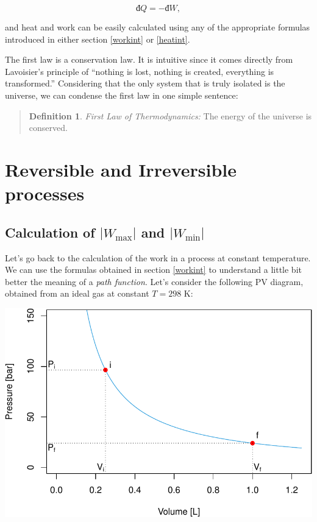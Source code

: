 \documentclass[
  9pt,
]{extbook}
\theoremstyle{definition}
\newtheorem{definition}{Definition}[chapter]
\theoremstyle{definition}
\theoremstyle{definition}
\theoremstyle{remark}
\begin{document}
\begin{equation}
  đ Q = -đ W,
  \label{eq:heateqwork}
\end{equation}

and heat and work can be easily calculated using any of the appropriate formulas introduced in either section \ref{workint} or \ref{heatint}.

The first law is a conservation law. It is intuitive since it comes directly from Lavoisier's principle of ``nothing is lost, nothing is created, everything is transformed.'' Considering that the only system that is truly isolated is the universe, we can condense the first law in one simple sentence:

\begin{quote}
\begin{definition}
\protect\hypertarget{def:firstlaw}{}{\label{def:firstlaw} }\emph{First Law of Thermodynamics:} The energy of the universe is conserved.
\end{definition}
\end{quote}

\hypertarget{reversible-and-irreversible-processes}{%
\section{Reversible and Irreversible processes}\label{reversible-and-irreversible-processes}}

\hypertarget{calculation-of-w_textmax-and-w_textmin}{%
\subsection{\texorpdfstring{Calculation of \(| W_{\text{max}} |\) and \(| W_{\text{min}} |\)}{Calculation of \textbar{} W\_\{\textbackslash text\{max\}\} \textbar{} and \textbar{} W\_\{\textbackslash text\{min\}\} \textbar{}}}\label{calculation-of-w_textmax-and-w_textmin}}

Let's go back to the calculation of the work in a process at constant temperature. We can use the formulas obtained in section \ref{workint} to understand a little bit better the meaning of a \emph{path function}. Let's consider the following PV diagram, obtained from an ideal gas at constant \(T=298\) K:

\begin{center}\includegraphics[width=0.7\linewidth]{pchem1_files/figure-latex/unnamed-chunk-2-1} \end{center}
\end{document}
